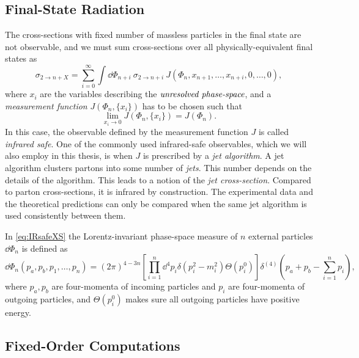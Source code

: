 \subsection{Final-State Radiation}

The cross-sections with fixed number of massless particles in the final state are not observable,
and we must sum cross-sections over all physically-equivalent final states as
\begin{equation} \label{eq:IRsafeXS}
  \sigma_{2\rightarrow n + X} = %
  \sum_{i=0}^{\infty} \int \dd\Phi_{n+i} ~ \sigma_{2\rightarrow n+i} ~ J(\Phi_{n},x_{n+1},\ldots,x_{n+i},0,\ldots,0),
\end{equation}
where $x_i$ are the variables describing the $\emph{unresolved phase-space}$, and
a \emph{measurement function} $J(\Phi_n, \{x_i\})$ has to be chosen such that
\begin{equation}
  \lim_{x_i\to 0}J(\Phi_n, \{x_i\}) = J(\Phi_n).
  \label{eq:IRsafeConditions}
\end{equation}
In this case, the observable defined by the measurement function $J$ is called \emph{infrared safe}.
One of the commonly used infrared-safe observables, which we will also employ in this thesis,
is when $J$ is prescribed by a \emph{jet algorithm}. A jet algorithm clusters partons
into some number of \emph{jets}. This number depends on the details of the algorithm.
This leads to a notion of the \emph{jet cross-section}. Compared to parton cross-sections, it is infrared by construction.
The experimental data and the theoretical predictions can only be compared when the same jet algorithm is used consistently between them.

In \cref{eq:IRsafeXS} the Lorentz-invariant phase-space measure of $n$ external particles $\dd\Phi_n$ is defined as
\begin{equation}
  \dd\Phi_n(p_a,p_b,p_1,\ldots,p_n) = (2\pi)^{4-3n} \left[ \prod_{i=1}^{n}\dd^4 p_i \delta(p_i^2-m_i^2) \Theta(p_i^{0}) \right] \delta^{(4)}\left(p_a+p_b - \sum_{i=1}^{n}p_i\right),
  \label{eq:PS}
\end{equation}
where $p_a,p_b$ are four-momenta of incoming particles and $p_i$ are four-momenta of outgoing particles, and
$\Theta(p_i^{0})$ makes sure all outgoing particles have positive energy.


\subsection{Fixed-Order Computations}
\label{sec:fixed_order}

